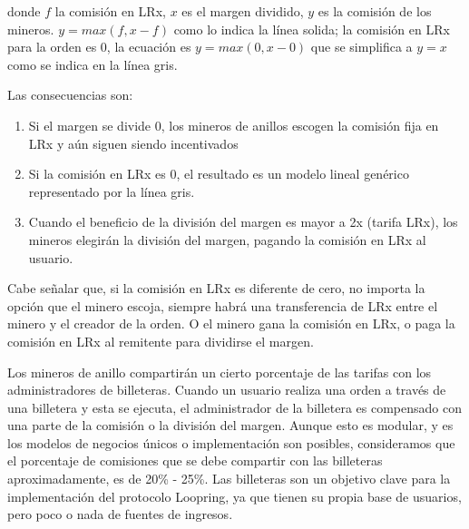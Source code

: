 \documentclass[UTF8,nofonts]{article}
\begin{document}
\begin{multicols}{2}
donde $f$ la comisi\'on en LRx, $x$ es el margen dividido, $y$ es la comisi\'on de los mineros. $y=max(f, x-f)$ como lo indica la l\'inea solida; la comisi\'on en LRx para la orden es $0$, la ecuaci\'on es  $y=max(0, x - 0)$ que se simplifica a $y=x$ como se indica en la l\'inea gris.

Las consecuencias son:
\begin{enumerate}
	\item Si el margen se divide 0, los mineros de anillos escogen la comisi\'on fija en LRx y a\'un siguen siendo incentivados 
	\item Si la comisi\'on en LRx es 0, el resultado es un modelo lineal gen\'erico representado por la l\'inea gris.
	\item Cuando el beneficio de la divisi\'on del margen es mayor a 2x (tarifa LRx), los mineros elegir\'an la divisi\'on del margen, pagando la comisi\'on en LRx al usuario.
\end{enumerate}
Cabe se\~nalar que, si la comisi\'on en LRx es diferente de cero, no importa la opci\'on que el minero escoja, siempre habr\'a una transferencia de LRx entre el minero y el creador de la orden. O el minero gana la comisi\'on en LRx, o paga la comisi\'on en LRx al remitente para dividirse el margen.

Los mineros de anillo compartir\'an un cierto porcentaje de las tarifas con los administradores de billeteras. Cuando un usuario realiza una orden a trav\'es de una billetera y esta se ejecuta, el administrador de la billetera es compensado con una parte de la comisi\'on o la divisi\'on del margen. Aunque esto es modular, y es los modelos de negocios \'unicos o implementaci\'on son posibles, consideramos que el porcentaje de comisiones que se debe compartir con las billeteras aproximadamente, es de 20\% - 25\%. Las billeteras son un objetivo clave para la implementaci\'on del protocolo Loopring, ya que tienen su propia base de usuarios, pero poco o nada de fuentes de ingresos.


\end{multicols}
\end{document}
